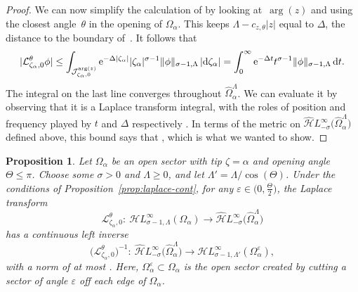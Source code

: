 \documentclass[10pt,a4paper]{amsart}
\newcommand{\singexp}[2]{\mathcal{H}L^\infty_{#1, #2}}
\newcommand{\dualsingexp}[1]{\widehat{\mathcal{H}}L^\infty_{#1}}
\newcommand{\maps}{\colon}
\newcommand{\laplace}{\mathcal{L}}
\numberwithin{equation}{section}
\newtheorem{Proposition}[Theorem]{Proposition}
 { \theoremstyle{definition}
\newtheorem{Definition}[Theorem]{Definition}
\newtheorem{Remark}[Theorem]{Remark}
\newtheorem*{notation*}{Notation}
}
\begin{document}
\begin{proof}
We can now simplify the calculation of \smash{$\laplace_{\zeta_\alpha, 0}^\theta \phi$} by looking at~$\arg(z)$ and using the closest angle~$\theta$ in the opening of $\Omega_\alpha$. This keeps $\Lambda - c_{z, \theta}|z|$ equal to $\Delta$, the distance to the boundary of~\smash{$\widehat{\Omega}_\alpha^\Lambda$}. It follows that
\begin{equation*}
|\laplace_{\zeta_\alpha, 0}^\theta \phi| \le \int_{\mathcal{J}_{\zeta_\alpha, 0}^{\arg(z)}} {\rm e}^{-\Delta|\zeta_\alpha|} |\zeta_\alpha|^{\sigma-1} \|\phi\|_{\sigma-1, \Lambda}\, |{\rm d}\zeta_\alpha| = \int_0^\infty {\rm e}^{-\Delta t} t^{\sigma-1} \|\phi\|_{\sigma-1, \Lambda} \,{\rm d}t.
\end{equation*}
The integral on the last line converges throughout $\widehat{\Omega}_\alpha^\Lambda$. We can evaluate it by observing that it is a Laplace transform integral, with the roles of position and frequency played by $t$ and $\Delta$ respectively
\smash{$\big|\laplace_{\zeta_\alpha, 0}^\theta \phi\big| \le \Gamma(\sigma) \Delta^{-\sigma} \|\phi\|_{\sigma-1, \Lambda}$}.
In terms of the metric on $\dualsingexp{-\sigma}\bigl(\widehat{\Omega}_\alpha^\Lambda\bigr)$ defined above, this bound says that
\smash{$\big\|\laplace_{\zeta_\alpha, 0}^\theta \phi\big\|_{-\sigma, \Lambda} \le \Gamma(\sigma) \|\phi\|_{\sigma-1, \Lambda}$},
which is what we wanted to show.
\end{proof}

\begin{Proposition}\label{prop:inverse_laplace_analytic}
Let $\Omega_\alpha$ be an open sector with tip $\zeta = \alpha$ and opening angle $\Theta \le \pi$. Choose some $\sigma > 0$ and $\Lambda \ge 0$, and let $\Lambda' = \Lambda / \cos(\Theta)$. Under the conditions of Proposition~{\rm\ref{prop:laplace-cont}}, for any $\varepsilon \in \big(0, \frac{\Theta}{2}\big)$, the Laplace transform
\[ \laplace_{\zeta_\alpha, 0}^\theta \maps\ \singexp{\sigma-1}{\Lambda}(\Omega_\alpha) \to \dualsingexp{-\sigma}\bigl(\widehat{\Omega}_\alpha^\Lambda\bigr) \]
has a continuous left inverse
\[ \bigl(\laplace_{\zeta_\alpha, 0}^\theta\bigr)^{-1} \maps\ \dualsingexp{-\sigma}\bigl(\widehat{\Omega}_\alpha^\Lambda\bigr) \to \singexp{\sigma-1}{\Lambda'}(\Omega_\alpha^\varepsilon), \]
with a norm of at most
.
Here, $\Omega_\alpha^\varepsilon \subset \Omega_\alpha$ is the open sector created by cutting a sector of angle $\varepsilon$ off each edge of $\Omega_\alpha$.
\end{Proposition}
\end{document}
